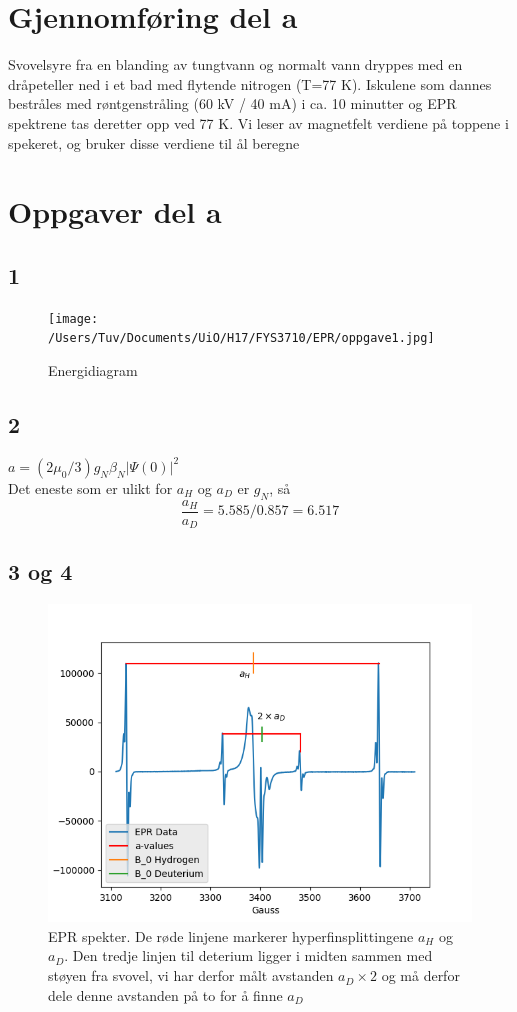 \documentclass[a4paper, 12pt]{article}
\begin{document}
\section{Gjennomføring del a}
Svovelsyre fra en blanding av tungtvann og normalt vann dryppes med en dråpeteller ned i et bad med flytende nitrogen (T=77 K). Iskulene som dannes bestråles med røntgenstråling (60 kV / 40 mA) i ca. 10 minutter og EPR spektrene tas deretter opp ved 77 K. Vi leser av magnetfelt verdiene på toppene i spekeret, og bruker disse verdiene til ål beregne
\section{Oppgaver del a}
\subsection*{1}%
\begin{figure}[H]
\centering
\texttt{[image: /Users/Tuv/Documents/UiO/H17/FYS3710/EPR/oppgave1.jpg]}
\caption{Energidiagram}
\end{figure}
\subsection*{2}%
$a = (2\mu_{0} /3)g_N\beta_{N}|\Psi (0)|^2$\\
Det eneste som er ulikt for $a_H$ og $a_D$ er $g_N$, så 
$$\frac{a_H}{a_D}=5.585/0.857 = 6.517$$
\subsection*{3 og 4}%
\begin{figure}[H]
\centering
\includegraphics[scale=.8]{epr.png}
\caption{EPR spekter. De røde linjene markerer hyperfinsplittingene $a_H$ og $a_D$. Den tredje linjen til deterium ligger i midten sammen med støyen fra svovel, vi har derfor målt avstanden $a_D\times 2$ og må derfor dele denne avstanden på to for å finne $a_D$}
\end{figure}
\end{document}
